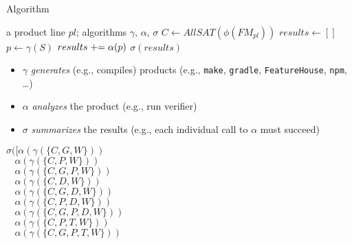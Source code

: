 \begin{frame}{\myframetitle}
	\begin{fancycolumns}
		\begin{definition}{Algorithm}
			\begin{algorithmic}
				\Require a product line $pl$; algorithms $\gamma$, $\alpha$, $\sigma$
				\State $C \gets AllSAT(\phi(FM_{pl}))$ 
				\State $results \gets []$
				 
				\State $p \gets \gamma(S)$ 
				\State $results \mathrel{+}= \alpha(p)$ 
				\EndFor
				\State \Return $\sigma(results)$
			\end{algorithmic}
		\end{definition}
		\begin{note}{}
			\begin{itemize}
				\item $\gamma$ \emph{generates} (e.g., compiles) products (e.g., \texttt{make}, \texttt{gradle}, \texttt{FeatureHouse}, \texttt{npm}, \ldots)
				\item $\alpha$ \emph{analyzes} the product (e.g., run verifier)
				\item $\sigma$ \emph{summarizes} the results (e.g., each individual call to $\alpha$ must succeed)
			\end{itemize}
		\end{note}
	\nextcolumn
		\begin{exampletight}{}
			\begin{center}
				\small\featureDiagramConfigurableDatabase
			\end{center}
		\end{exampletight}
		\begin{example}{}
			\footnotesize
			\begin{fancycolumns}[animation=none]
				$\sigma([\alpha(\gamma(\{C,G,W\}))$\\
				$~~~~\alpha(\gamma(\{C,P,W\}))$\\
				$~~~~\alpha(\gamma(\{C,G,P,W\}))$\\
				$~~~~\alpha(\gamma(\{C,D,W\}))$\\
				$~~~~\alpha(\gamma(\{C,G,D,W\}))$\\
				$~~~~\alpha(\gamma(\{C,P,D,W\}))$\\
				$~~~~\alpha(\gamma(\{C,G,P,D,W\}))$\\
				$~~~~\alpha(\gamma(\{C,P,T,W\}))$\\
				$~~~~\alpha(\gamma(\{C,G,P,T,W\}))$\\

\end{fancycolumns}
\end{example}
\end{fancycolumns}
\end{frame}
